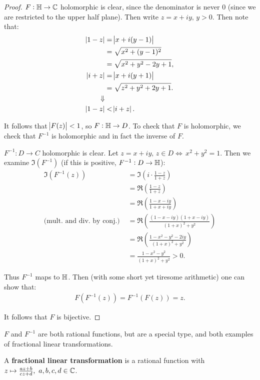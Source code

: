 \begin{proof}
$F: \mathbb{H} \to \mathbb{C}$ holomorphic is clear, since the denominator is never $0$ (since we are restricted to the upper half plane). Then write $z = x + iy, \, y >0$. Then note that:
\begin{align*}
    \abs{1-z } &= \abs{x + i(y-1)}\\
    &= \sqrt{x^2 +(y-1)^2}\\
    &= \sqrt{x^2 + y^2 - 2y +1},\\
    \abs{i+z} &= \abs{x+ i (y+1)}\\
    &= \sqrt{z^2 + y^2 +2y +1}.\\
    \Downarrow\\
    \abs{1-z } &< \abs{i+z}.
\end{align*}

It follows that $\abs{F(z)} <1$, so $F : \mathbb{H} \to D$. To check that $F$ is holomorphic, we check that $F^{-1}$ is holomorphic and in fact the inverse of $F$.

$F^{-1}:D \to C$ holomorphic is clear. Let $z = x+iy, \, z \in D \Leftrightarrow \, x^2+y^2 = 1$. Then we examine $\Im (F^{-1} )$ (if this is positive, $F^{-1}:D \to \mathbb{H}$):
\begin{align*}
    \Im \left( F^{-1}(z) \right) &= \Im \left( i \cdot \frac{1-z}{1+z} \right)\\ &= \Re \left( \frac{1-z}{1+z} \right)\\
    &= \Re \left( \frac{1-x-iy}{1+x+iy} \right)\\
   \text{(mult. and div. by conj.) } &= \Re \left( \frac{(1-x-iy)(1+x-iy)}{(1+x)^2+y^2} \right)\\
   &= \Re \left( \frac{1-x^2-y^2-2iy}{(1+x)^2+y^2} \right)\\
   &= \frac{1-x^2-y^2}{(1+x)^2+y^2} > 0.
\end{align*}
 
Thus $F^{-1}$ maps to $\mathbb{H}$. Then (with some short yet tiresome arithmetic) one can show that: 
\begin{align*}
    F\left( F^{-1} (z) \right) = F^{-1}\left( F (z) \right) = z.
\end{align*}

It follows that $F$ is bijective.
\end{proof}




$F$ and $F^{-1}$ are both rational functions, but are a special type, and both examples of fractional linear transformations.


\begin{definition}
A \textbf{fractional linear transformation} is a rational function with $z \mapsto \frac{az+b}{cz+d}, \, \, a,b,c,d \in \mathbb{C}$.
\end{definition}

